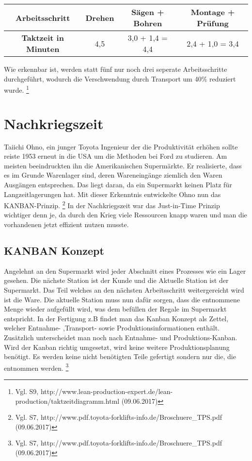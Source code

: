 \documentclass[00_ToyotaProduktionssystem.tex]{subfiles}
\begin{document}
\begin{center}
\begin{tabular}{|>{\bfseries}c|c|c|c|}
\hline
Arbeitsschritt & Drehen & Sägen + Bohren & Montage + Prüfung \\
\hline
Taktzeit in Minuten & 4,5 & 3,0 + 1,4 = 4,4 & 2,4 + 1,0 = 3,4 \\
\hline
\end{tabular}
\end{center}
Wie erkennbar ist, werden statt fünf nur noch drei seperate Arbeitsschritte durchgeführt, wodurch die Verschwendung durch Transport um 40\% reduziert wurde. 
\footnote{Vgl. S9,  http://www.lean-production-expert.de/lean-production/taktzeitdiagramm.html (09.06.2017)}

\section{Nachkriegszeit}
Taiichi Ohno, ein junger Toyota Ingenieur der die Produktivität erhöhen sollte reiste 1953 erneut in die USA um die Methoden bei Ford zu studieren. Am meisten beeindruckten ihn die Amerikanischen Supermärkte. Er realisierte, dass es im Grunde Warenlager sind, deren Wareneingänge ziemlich den Waren Ausgängen entsprechen. Das liegt daran, da ein Supermarkt keinen Platz für Langzeitlagerungen hat. Mit dieser Erkenntnis entwickelte Ohno nun das KANBAN-Prinzip.
\footnote{Vgl. S7,  http://www.pdf.toyota-forklifts-info.de/Broschuere\_TPS.pdf (09.06.2017)}
 In der Nachkriegszeit war das Just-in-Time Prinzip wichtiger denn je, da durch den Krieg viele Ressourcen knapp waren und man die vorhandenen jetzt effizient nutzen musste.
\subsection{KANBAN Konzept}
Angelehnt an den Supermarkt wird jeder Abschnitt eines Prozesses wie ein Lager gesehen. Die nächste Station ist der Kunde und die Aktuelle Station ist der Supermarkt. Das Teil welches an den nächsten Arbeitsschritt weitergereicht wird ist die Ware. Die aktuelle Station muss nun dafür sorgen, dass die entnommene Menge wieder aufgefüllt wird, was dem befüllen der Regale im Supermarkt entspricht.
In der Fertigung z.B findet man das Kanban Konzept als Zettel, welcher Entnahme- ,Transport- sowie Produktionsinformationen enthält.
Zusätzlich unterscheidet man noch nach Entnahme- und Produktions-Kanban.
Wird der Kanban richtig umgesetzt, wird keine weitere Produktionsplanung benötigt. Es werden keine nicht benötigten Teile gefertigt sondern nur die, die entnommen werden. 
\footnote{Vgl. S7,  http://www.pdf.toyota-forklifts-info.de/Broschuere\_TPS.pdf (09.06.2017)}
\end{document}
